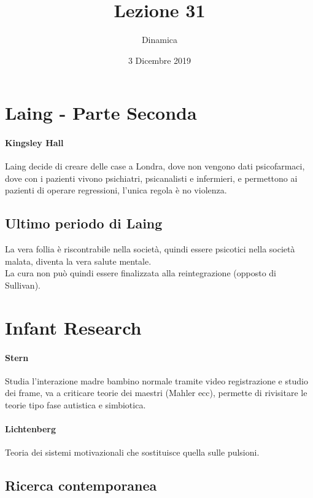 \documentclass[12pt, a4paper]{article}
\date{3 Dicembre 2019}
\title{Lezione 31}
\author{Dinamica}
\begin{document}
\maketitle

\section{Laing - Parte Seconda}

\paragraph{Kingsley Hall}  Laing decide di creare delle case a Londra, dove non vengono dati psicofarmaci, dove con i pazienti vivono psichiatri, psicanalisti e infermieri, e permettono ai pazienti di operare regressioni, l'unica regola è no violenza.

\subsection{Ultimo periodo di Laing}

La vera follia è riscontrabile nella società, quindi essere psicotici nella società malata, diventa la vera salute mentale.
\medskip\\ 
La cura non può quindi essere finalizzata alla reintegrazione (opposto di Sullivan).

\section{Infant Research}

\paragraph{Stern}  Studia l'interazione madre bambino normale tramite video registrazione e studio dei frame, va a criticare teorie dei maestri (Mahler ecc), permette di rivisitare le teorie tipo fase autistica e simbiotica.

\paragraph{Lichtenberg}  Teoria dei sistemi motivazionali che sostituisce quella sulle pulsioni.

\subsection{Ricerca contemporanea}
\end{document}
